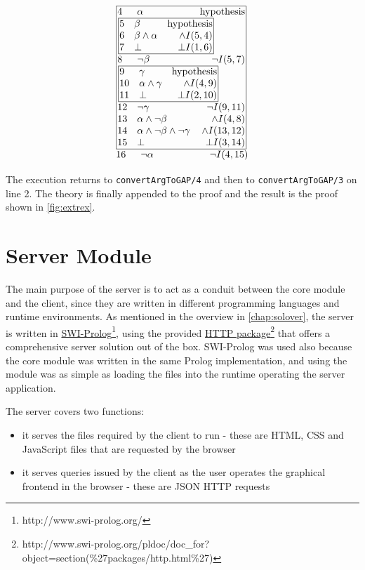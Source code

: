 \documentclass[11pt,twoside,a4paper]{report}
\begin{document}
\[\vbox{\offinterlineskip\halign{
&\tabskip=1.5em#\strut&$#$\hfil\tabskip=1em&\hfil$#$\tabskip=0em\cr
%
\multispan3\vbox{\halign{
\vrule#&&\hskip.1em\tabskip=1em#\strut&$#$\hfil\tabskip=1em&\hfil$#$\hskip0.1em\tabskip=0em&\vrule#\cr
\noalign{\hrule}
%
&4&\alpha&\mbox{hypothesis}&\cr
%
&\multispan3\,\vbox{\halign{
\vrule#&&\hskip.1em\tabskip=1em#\strut&$#$\hfil\tabskip=1em&\hfil$#$\hskip0.1em\tabskip=0em&\vrule#\cr
\noalign{\hrule}
%
&5&\beta&\mbox{hypothesis}&\cr
&6&\beta\wedge\alpha&\wedge I(5,4)&\cr
&7&\bot&\bot I(1,6)&\cr
%
\noalign{\hrule}}}\,&\cr
%
&8&\neg\beta&\neg I(5,7)&\cr
%
&\multispan3\,\vbox{\halign{
\vrule#&&\hskip.1em\tabskip=1em#\strut&$#$\hfil\tabskip=1em&\hfil$#$\hskip0.1em\tabskip=0em&\vrule#\cr
\noalign{\hrule}
%
&9&\gamma&\mbox{hypothesis}&\cr
&10&\alpha\wedge\gamma&\wedge I(4,9)&\cr
&11&\bot&\bot I(2,10)&\cr
%
\noalign{\hrule}}}\,&\cr
%
&12&\neg\gamma&\neg I(9,11)&\cr
&13&\alpha\wedge\neg\beta&\wedge I(4,8)&\cr
&14&\alpha\wedge\neg\beta\wedge\neg\gamma&\wedge I(13,12)&\cr
&15&\bot&\bot I(3,14)&\cr
%
\noalign{\hrule}}}\,\cr
%
16&\neg\alpha&\neg I(4,15)\cr
}}\]

The execution returns to \lstinline$convertArgToGAP/4$ and then to \lstinline$convertArgToGAP/3$ on line 2. The theory is finally appended to the proof and the result is the proof shown in \autoref{fig:extrex}.

\chapter{Server Module}
\label{chap:server}
The main purpose of the server is to act as a conduit between the core module and the client, since they are written in different programming languages and runtime environments. As mentioned in the overview in \autoref{chap:solover}, the server is written in \href{http://www.swi-prolog.org/}{SWI-Prolog}\footnote{http://www.swi-prolog.org/}, using the provided \href{http://www.swi-prolog.org/pldoc/doc_for?object=section(\%27packages/http.html\%27)}{HTTP package}\footnote{http://www.swi-prolog.org/pldoc/doc\_for?object=section(\%27packages/http.html\%27)} that offers a comprehensive server solution out of the box. SWI-Prolog was used also because the core module was written in the same Prolog implementation, and using the module was as simple as loading the files into the runtime operating the server application.

The server covers two functions:
\begin{itemize}
\item
it serves the files required by the client to run - these are HTML, CSS and JavaScript files that are requested by the browser
\item
it serves queries issued by the client as the user operates the graphical frontend in the browser - these are JSON HTTP requests
\end{itemize}
\end{document}

